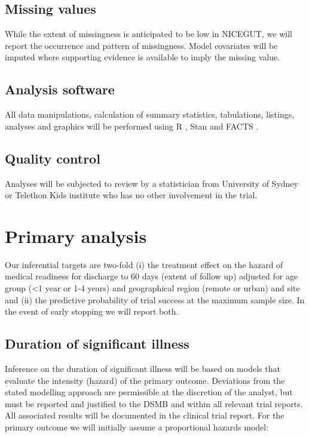 \documentclass[a4paper]{article}
\begin{document}
\subsection{Missing values}

While the extent of missingness is anticipated to be low in NICEGUT, we will report the occurrence and pattern of missingness.
Model covariates will be imputed where supporting evidence is available to imply the missing value.

\subsection{Analysis software}

All data manipulations, calculation of summary statistics, tabulations, listings, analyses and graphics will be performed using R \cite{R}, Stan \cite{Carpenter2017, RStan} and FACTS \cite{facts}.

\subsection{Quality control}

Analyses will be subjected to review by a statistician from University of Sydney or Telethon Kids institute who has no other involvement in the trial.

\section{Primary analysis}\label{primary-analysis}

Our inferential targets are two-fold (i) the treatment effect on the hazard of medical readiness for discharge to 60 days (extent of follow up) adjusted for age group (<1 year or 1-4 years) and geographical region (remote or urban) and site and (ii) the predictive probability of trial success at the maximum sample size.
In the event of early stopping we will report both.

\subsection{Duration of significant illness}

Inference on the duration of significant illness will be based on models that evaluate the intensity (hazard) of the primary outcome.
Deviations from the stated modelling approach are permissible at the discretion of the analyst, but must be reported and justified to the DSMB and within all relevant trial reports.
All associated results will be documented in the clinical trial report.
For the primary outcome we will initially assume a proportional hazards model:
\end{document}
